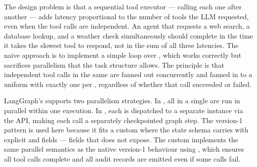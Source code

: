 The design problem is that a sequential tool executor --- calling each
 one after another --- adds latency proportional to the
number of tools the LLM requested, even when the tool calls are independent.
An agent that requests a web search, a database lookup, and a weather check
simultaneously should complete in the time it takes the slowest tool to
respond, not in the sum of all three latencies. The naive approach is to
implement a simple  loop over , which works
correctly but sacrifices parallelism that the task structure allows. The
principle is that independent tool calls in the same  are
fanned out concurrently and fanned in to a uniform 
with exactly one  per , regardless of
whether that call succeeded or failed.

LangGraph's  supports two parallelism strategies.
In , all  in a single 
are run in parallel within one  execution. In
, each  is dispatched to a separate
 instance via the  API, making each call a
separately checkpointed graph step. The version-1 pattern is used here
because it fits a custom  where the state schema carries
 with explicit  and
 fields --- fields that 
does not expose. The custom  implements the same
parallel semantics as the native  version-1 behaviour using
, which ensures all tool
calls complete and all audit records are emitted even if some calls fail.

